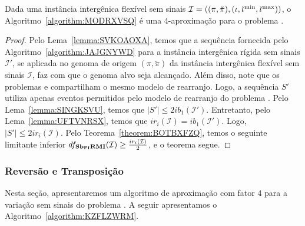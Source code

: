 \begin{theorem}\label{theorem:BSLEJJVB}
Dada uma instância intergênica flexível sem sinais $\mathcal{I} = ((\pi,\breve\pi),(\iota,\breve\iota^{\min},\break\breve\iota^{\max}))$, o Algoritmo~\ref{algorithm:MODRXVSQ} é uma $4$-aproximação para o problema \SbFIRMI{}.
\end{theorem}
\begin{proof}
Pelo Lema~\ref{lemma:SVKOAOXA}, temos que a sequência fornecida pelo Algoritmo~\ref{algorithm:JAJGNYWD} para a instância intergênica rígida sem sinais $\mathcal{I'}$, se aplicada no genoma de origem $(\pi,\breve\pi)$ da instância intergênica flexível sem sinais $\mathcal{I}$, faz com que o genoma alvo seja alcançado. Além disso, note que os problemas \SbIRMI{} e \SbFIRMI{} compartilham o mesmo modelo de rearranjo. Logo, a sequência $S'$ utiliza apenas eventos permitidos pelo modelo de rearranjo do problema \SbFIRMI{}. Pelo Lema~\ref{lemma:SINGKSVU}, temos que $|S'| \le 2ib_1(\mathcal{I'})$. Entretanto, pelo Lema~\ref{lemma:UFTVNRSX}, temos que $ir_i(\mathcal{I}) = ib_1(\mathcal{I'})$. Logo, $|S'| \le 2ir_i(\mathcal{I})$. Pelo Teorema~\ref{theorem:BOTBXFZQ}, temos o seguinte limitante inferior $df_{\textbf{Sb\textsubscript{FI}RMI}}(\mathcal{I}) \ge \frac{ir_i(\mathcal{I})}{2}$, e o teorema segue.
\end{proof}

\subsubsection{Reversão e Transposição}

Nesta seção, apresentaremos um algoritmo de aproximação com fator $4$ para a variação sem sinais do problema \SbFIRT{}. A seguir apresentamos o Algoritmo~\ref{algorithm:KZFLZWRM}.




